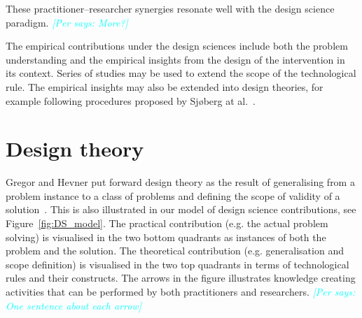 \documentclass[graybox]{svmult}
\newcommand{\emelie}[1]{\textcolor{red}{{\it [Emelie says: #1]}}}
\newcommand{\per}[1]{\textcolor{cyan}{{\it [Per says: #1]}}}
\newcommand{\emelie}[1]{}
\newcommand{\per}[1]{}
\begin{document}
These practitioner--researcher synergies resonate well with the design science paradigm. \per{More?}






The empirical contributions under the design sciences include both the problem understanding and the empirical insights from the design of the intervention in its context. Series of studies may be used to extend the scope of the technological rule. The empirical insights may also be extended into design theories, for example following procedures proposed by Sj{\o}berg at al.~\cite{sjoberg2008building}.

\section{Design theory}

Gregor and Hevner put forward design theory as the result of generalising from a problem instance to a class of problems and defining the scope of validity of a solution~\cite{gregor_positioning_2013}. This is also illustrated in our model of design science contributions, see Figure~\ref{fig:DS_model}. The practical contribution (e.g. the actual problem solving) is visualised in the two bottom quadrants as instances of both the problem and the solution. The theoretical contribution (e.g. generalisation and scope definition) is visualised in the two top quadrants in terms of technological rules and their constructs. The arrows in the figure illustrates knowledge creating activities that can be performed by both practitioners and researchers. \per{One sentence about each arrow}
\end{document}
